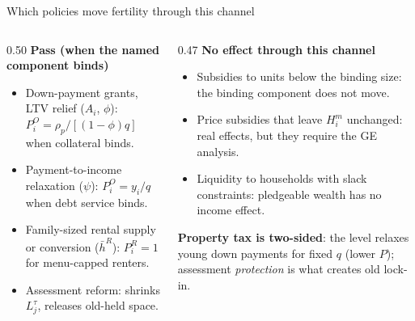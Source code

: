 \documentclass[11pt,aspectratio=169]{beamer}
\newcommand{\1}{\mathbf 1}
\begin{document}
\begin{frame}{Which policies move fertility through this channel}
\small
\begin{columns}[T]
\begin{column}{0.50\textwidth}
\textbf{Pass (when the named component binds)}
\footnotesize
\begin{itemize}\setlength{\itemsep}{0.35em}
  \item Down-payment grants, LTV relief ($A_i$, $\phi$): $P_i^O=\rho_p/[(1-\phi)q]$ when collateral binds.
  \item Payment-to-income relaxation ($\psi$): $P_i^O=y_i/q$ when debt service binds.
  \item Family-sized rental supply or conversion ($\bar h^R$): $P_i^R=1$ for menu-capped renters.
  \item Assessment reform: shrinks $L_j^\tau$, releases old-held space.
\end{itemize}
\end{column}
\begin{column}{0.47\textwidth}
\textbf{No effect through this channel}
\footnotesize
\begin{itemize}\setlength{\itemsep}{0.35em}
  \item Subsidies to units below the binding size: the binding component does not move.
  \item Price subsidies that leave $H_i^m$ unchanged: real effects, but they require the GE analysis.
  \item Liquidity to households with slack constraints: pledgeable wealth has no income effect.
\end{itemize}
\smallskip
\textbf{Property tax is two-sided}: the level relaxes young down payments for fixed $q$ (lower $P$); assessment \emph{protection} is what creates old lock-in.
\end{column}
\end{columns}
\end{frame}
\end{document}
